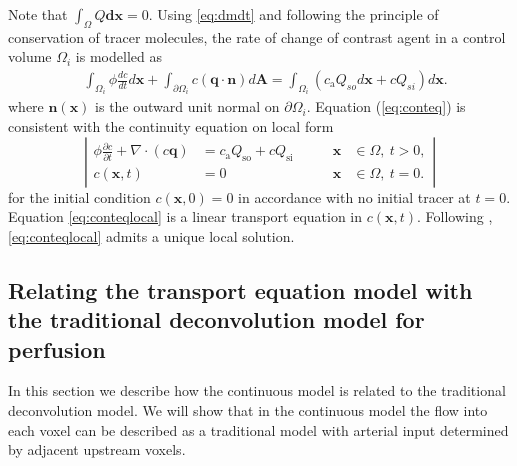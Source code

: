 \documentclass[10pt]{article}
\begin{document}
	Note that $\int_\Omega Q  \mathbf{dx} = 0$. 
	Using \eqref{eq:dmdt} and following the principle of conservation of tracer molecules, the rate of change of contrast agent in a control volume $\Omega_i$ is modelled as
	\begin{align}
		& \int_{\Omega_i} \phi \frac{d c}{dt} d \mathbf{x} + \int_{\partial \Omega_i}c(\mathbf{q} \cdot \mathbf{n}) d \mathbf{A}
		 = \int_{\Omega_i}(c_\mathrm{a} Q_{so} d \mathbf{x} + c Q_{si}) d \mathbf{x}.
		\label{eq:conteq}
	\end{align}
	where $\mathbf{n}(\mathbf{x})$ is the outward unit normal on $\partial \Omega_i$.
	Equation (\ref{eq:conteq}) is consistent with the continuity equation on local form
	\begin{equation}
		\left\vert
		\begin{alignedat}{2}
			\phi \frac{\partial c}{\partial t} + \nabla \cdot (c\mathbf{q}) &= c_\mathrm{a}Q_{\mathrm{so}} + cQ_{\mathrm{si}} \qquad	&\mathbf{x} &\in \Omega, \ t>0,  \\
			c(\mathbf{x},t) &= 0 																			 	&\mathbf{x} &\in \Omega, \ t=0.
		\end{alignedat}
		\right\vert
		\label{eq:conteqlocal}
	\end{equation}
	for the initial condition $c(\mathbf{x},0) = 0$ in accordance with no initial tracer at $t = 0$.
	Equation \eqref{eq:conteqlocal} is a linear transport equation in $c(\mathbf{x},t)$. 
	Following \cite{evans98}, \eqref{eq:conteqlocal} admits a unique local solution.


\subsection{Relating the transport equation model with the traditional deconvolution model for perfusion}\label{sec:NewAndOld}
	In this section we describe how the continuous model is related to the traditional deconvolution model.
	We will show that in the continuous model the flow into each voxel can be described as a traditional model with arterial input determined by adjacent upstream voxels.
\end{document}
